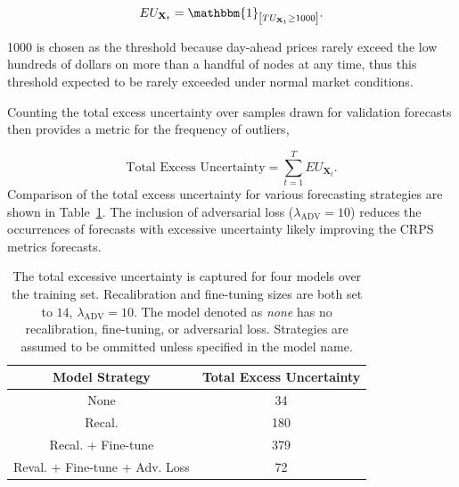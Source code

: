 \begin{equation*}
    EU_{\mathbf{X}_t} = \mathbbm{1}_{\left[ TU_{\mathbf{X}_t} \geq 1000 \right]}.
    \label{eq:excess_unc}
\end{equation*}

1000 is chosen as the threshold because day-ahead prices rarely exceed the low hundreds of dollars on more than a
handful of nodes at any time, thus this threshold expected to be rarely exceeded under normal market conditions.

Counting the total excess uncertainty over samples drawn for validation forecasts then provides a metric for the
frequency of outliers,

\begin{equation*}
    \text{Total Excess Uncertainty} = \sum_{t=1}^{T} EU_{\textbf{X}_t}.
    \label{eq:total_unc}
\end{equation*}
Comparison of the total excess uncertainty for various forecasting strategies are shown in Table~\ref{tab:total_unc}.
The inclusion of adversarial loss ($\lambda_{\text{ADV}} = 10$) reduces the occurrences of forecasts with excessive
uncertainty likely improving the CRPS metrics forecasts.

\begin{table}[htb]
    \caption[Count of forecasts with excessive uncertainty over various models]{
        The total excessive uncertainty is captured for four models over the training set.
        Recalibration and fine-tuning sizes are both set to $14$, $\lambda_{\text{ADV}} = 10$.
        The model denoted as \textit{none} has no recalibration, fine-tuning, or adversarial loss.
        Strategies are assumed to be ommitted unless specified in the model name.
    }
    \begin{center}
        \begin{tabular}{||c|c||} \hline
        Model Strategy & Total Excess Uncertainty  \\	%
        \hline \hline
        None                            & 34 \\ \hline
        Recal.                          & 180 \\ \hline
        Recal. + Fine-tune              & 379 \\ \hline
        Reval. + Fine-tune + Adv. Loss  & 72 \\ \hline
        \end{tabular}
        \\ \rule{0mm}{5mm}
    \end{center}
    \label{tab:total_unc}
\end{table}

